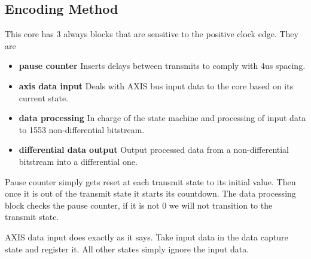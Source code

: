 \subsection{Encoding Method}
\par
This core has 3 always blocks that are sensitive to the positive clock edge. They are

\begin{itemize}
\item \textbf{pause counter} Inserts delays between transmits to comply with 4us spacing.
\item \textbf{axis data input} Deals with AXIS bus input data to the core based on its current state.
\item \textbf{data processing} In charge of the state machine and processing of input data to 1553 non-differential bitstream.
\item \textbf{differential data output} Output processed data from a non-differential bitstream into a differential one.
\end{itemize}

\par
Pause counter simply gets reset at each transmit state to its initial value. Then once it is out of the transmit state it starts its countdown.
The data processing block checks the pause counter, if it is not 0 we will not transition to the transmit state.

\par
AXIS data input does exactly as it says. Take input data in the data capture state and register it. All other states simply ignore the input data.

